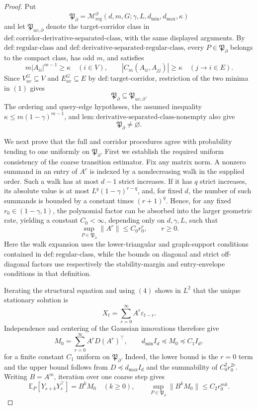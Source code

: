 \documentclass{article}
\begin{document}
\begin{proof}
Put
\[
 \mathfrak P_{\partial}
 =\mathcal M_{\mathrm{reg}}^{\partial}
 (d,m,G;\gamma,L,d_{\min},d_{\max},\kappa)
\]
and let \(\mathfrak P_{uv,\partial}\) denote the target-corridor class in
\(\mathrm{def{:}corridor\mbox{-}derivative\mbox{-}separated\mbox{-}class}\),
with the same displayed arguments.  By
\(\mathrm{def{:}regular\mbox{-}class}\) and
\(\mathrm{def{:}derivative\mbox{-}separated\mbox{-}regular\mbox{-}class}\),
every \(P\in\mathfrak P_{\partial}\) belongs to the compact class, has odd
\(m\), and satisfies
\[
 m|A_{ii}|^{m-1}\geq\kappa\quad(i\in V),
 \qquad
 |C_m(A_{ii},A_{jj})|\geq\kappa\quad(j\to i\in E).
 \tag{1}
\]
Since \(V_{uv}^{G}\subseteq V\) and \(E_{uv}^{G}\subseteq E\) by
\(\mathrm{def{:}target\mbox{-}corridor}\), restriction of the two minima
in \((1)\) gives
\[
 \mathfrak P_{\partial}\subseteq\mathfrak P_{uv,\partial}.
 \tag{2}
\]
The ordering and query-edge hypotheses, the assumed inequality
\(\kappa\leq m(1-\gamma)^{m-1}\), and
\(\mathrm{lem{:}derivative\mbox{-}separated\mbox{-}class\mbox{-}nonempty}\)
also give
\[
 \mathfrak P_{\partial}\neq\varnothing.
 \tag{3}
\]

We next prove that the full and corridor procedures agree with probability
tending to one uniformly on \(\mathfrak P_{\partial}\).  First we establish
the required uniform consistency of the coarse transition estimator.  Fix
any matrix norm.  A nonzero summand in an entry of \(A^r\) is indexed by a
nondecreasing walk in the supplied order.  Such a walk has at most
\(d-1\) strict increases.  If it has \(q\) strict increases, its absolute
value is at most \(L^q(1-\gamma)^{r-q}\), and, for fixed \(d\), the number
of such summands is bounded by a constant times \((r+1)^q\).  Hence, for
any fixed \(r_0\in(1-\gamma,1)\), the polynomial factor can be absorbed
into the larger geometric rate, yielding a constant \(C_0<\infty\),
depending only on \(d,\gamma,L\), such that
\[
 \sup_{P\in\mathfrak P_{\partial}}\|A^r\|
 \leq C_0r_0^r,
 \qquad r\geq0.
 \tag{4}
\]
Here the walk expansion uses the lower-triangular and graph-support
conditions contained in \(\mathrm{def{:}regular\mbox{-}class}\), while the
bounds on diagonal and strict off-diagonal factors use respectively the
stability-margin and entry-envelope conditions in that definition.

Iterating the structural equation and using \((4)\) shows in \(L^2\) that
the unique stationary solution is
\[
 X_t=\sum_{r=0}^{\infty}A^r\varepsilon_{t-r}.
\]
Independence and centering of the Gaussian innovations therefore give
\[
 M_0=\sum_{r=0}^{\infty}A^rD(A^r)^\top,
 \qquad
 d_{\min}I_d\preceq M_0\preceq C_1I_d,
 \tag{5}
\]
for a finite constant \(C_1\) uniform on \(\mathfrak P_{\partial}\).
Indeed, the lower bound is the \(r=0\) term and the upper bound follows
from \(D\preceq d_{\max}I_d\) and the summability of \(C_0^2r_0^{2r}\).
Writing \(B=A^m\), iteration over one coarse step gives
\[
 \mathbb E_P[Y_{s+k}Y_s^\top]=B^kM_0\quad(k\geq0),
 \qquad
 \sup_{P\in\mathfrak P_{\partial}}\|B^kM_0\|
 \leq C_2r_0^{mk}.
 \tag{6}
\]


\end{proof}
\end{document}
